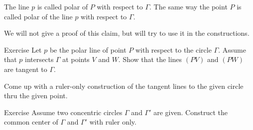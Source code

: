 The line $p$ is called polar of $P$ with respect to $\Gamma$.
The same way the point $P$ is called polar of the line $p$ with respect to $\Gamma$.

We will not give a proof of this claim, but will try to use it in the constructions.

\begin{thm}{Exercise}\label{ex:tangent ruler}
Let $p$ be the polar line of point $P$ with respect to the circle $\Gamma$.
Assume that $p$ intersects $\Gamma$ at points $V$ and $W$.
Show that the lines $(PV)$ and $(PW)$ are tangent to $\Gamma$.

Come up with a ruler-only construction of the tangent lines to the given circle thru the given point.
\end{thm}

\begin{thm}{Exercise}\label{ex:concentric-circ}
Assume two concentric circles $\Gamma$ and $\Gamma'$ are given.
Construct the common center of $\Gamma$ and $\Gamma'$ with ruler only.
\end{thm}


